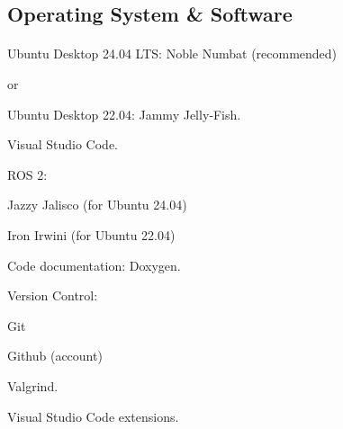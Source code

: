 \documentclass[
    10pt,
    dvipsnames,
    svgnames,
    x11names,
    aspectratio=1610,
    english,
    codeminted]{beamer}
\begin{document}
\subsection*{Operating System \& Software}
\begingroup
\divframetrue
\renewcommand{\divbartextA}{\secname}
\renewcommand{\divbartextB}{}
\begin{frame}{\secname}
  \divbar{\secname}{\subsecname}
  \framesubtitle{\subsecname}
\begin{compactitem}
    \item Ubuntu Desktop 24.04 LTS: Noble Numbat (recommended)
    \item[]or 
    \item Ubuntu Desktop 22.04: Jammy Jelly‐Fish. 
\end{compactitem}

\begin{compactitem}
    \item Visual Studio Code.
    \item ROS 2:
    \begin{compactitem}
        \item Jazzy Jalisco (for Ubuntu 24.04)
        \item Iron Irwini (for Ubuntu 22.04)
    \end{compactitem}
    \item Code documentation: Doxygen.
    \item Version Control:
    \begin{compactitem}
        \item Git
        \item Github (account)
    \end{compactitem}
    \item Valgrind.
    \item Visual Studio Code extensions.
\end{compactitem}
\end{frame}
\endgroup


\end{document}
